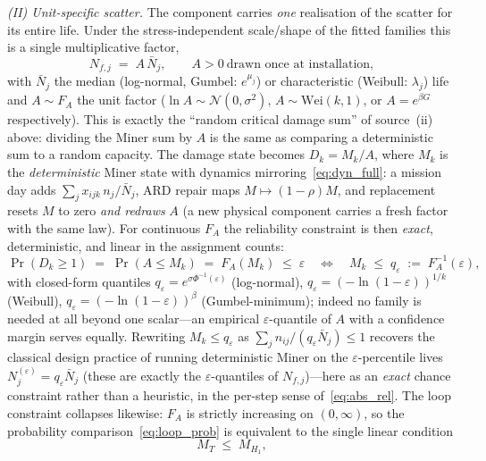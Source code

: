 \documentclass[11pt,a4paper]{article}
\theoremstyle{plain}
\theoremstyle{definition}
\theoremstyle{remark}
\begin{document}
\emph{(II) Unit-specific scatter.}
The component carries \emph{one} realisation of the scatter for its entire life.
Under the stress-independent scale/shape of the fitted families this is a single multiplicative factor,
\begin{equation}\label{eq:miner_unit}
  N_{f,j} \;=\; A\,\bar N_j, \qquad A > 0 \ \text{drawn once at installation},
\end{equation}
with $\bar N_j$ the median (log-normal, Gumbel: $e^{\mu_j}$) or characteristic (Weibull: $\lambda_j$) life and $A \sim F_A$ the unit factor ($\ln A \sim \mathcal{N}(0,\sigma^2)$, $A \sim \mathrm{Wei}(k,1)$, or $A = e^{\beta G}$ respectively).
This is exactly the ``random critical damage sum'' of source~(ii) above: dividing the Miner sum by $A$ is the same as comparing a deterministic sum to a random capacity.
The damage state becomes $D_k = M_k / A$, where $M_k$ is the \emph{deterministic} Miner state with dynamics mirroring~\eqref{eq:dyn_full}: a mission day adds $\sum_j x_{ijk}\, n_j/\bar N_j$, ARD repair maps $M \mapsto (1-\rho)M$, and replacement resets $M$ to zero \emph{and redraws} $A$ (a new physical component carries a fresh factor with the same law).
For continuous $F_A$ the reliability constraint is then \emph{exact}, deterministic, and linear in the assignment counts:
\begin{equation}\label{eq:miner_quantile}
  \Pr(D_k \ge 1) \;=\; \Pr(A \le M_k) \;=\; F_A(M_k) \;\le\; \varepsilon
  \quad\Longleftrightarrow\quad
  M_k \;\le\; q_\varepsilon \;:=\; F_A^{-1}(\varepsilon),
\end{equation}
with closed-form quantiles $q_\varepsilon = e^{\sigma\Phi^{-1}(\varepsilon)}$ (log-normal), $q_\varepsilon = (-\ln(1-\varepsilon))^{1/k}$ (Weibull), $q_\varepsilon = (-\ln(1-\varepsilon))^{\beta}$ (Gumbel-minimum); indeed no family is needed at all beyond one scalar---an empirical $\varepsilon$-quantile of $A$ with a confidence margin serves equally.
Rewriting $M_k \le q_\varepsilon$ as $\sum_j n_{ij}/(q_\varepsilon \bar N_j) \le 1$ recovers the classical design practice of running deterministic Miner on the $\varepsilon$-percentile lives $N^{(\varepsilon)}_j = q_\varepsilon \bar N_j$ (these are exactly the $\varepsilon$-quantiles of $N_{f,j}$)---here as an \emph{exact} chance constraint rather than a heuristic, in the per-step sense of~\eqref{eq:abs_rel}.
The loop constraint collapses likewise: $F_A$ is strictly increasing on $(0,\infty)$, so the probability comparison~\eqref{eq:loop_prob} is equivalent to the single linear condition
\begin{equation}\label{eq:miner_loop_det}
  M_T \;\le\; M_{H_1},
\end{equation}
\end{document}
